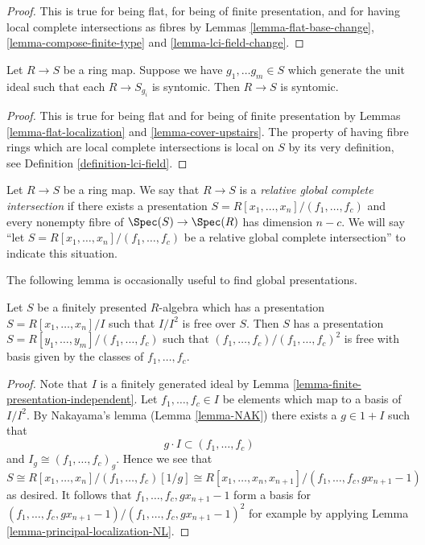 \begin{proof}
This is true for being flat, for being of finite presentation,
and for having local complete intersections as fibres by
Lemmas \ref{lemma-flat-base-change}, \ref{lemma-compose-finite-type} and
\ref{lemma-lci-field-change}.
\end{proof}

\begin{lemma}
\label{lemma-local-syntomic}
Let $R \to S$ be a ring map.
Suppose we have $g_1, \ldots g_m \in S$ which generate the
unit ideal such that each $R \to S_{g_i}$ is syntomic.
Then $R \to S$ is syntomic.
\end{lemma}

\begin{proof}
This is true for being flat and for being of finite presentation by
Lemmas \ref{lemma-flat-localization} and \ref{lemma-cover-upstairs}.
The property of having fibre rings which are local complete intersections
is local on $S$ by its very definition, see
Definition \ref{definition-lci-field}.
\end{proof}

\begin{definition}
\label{definition-relative-global-complete-intersection}
Let $R \to S$ be a ring map. We say that $R \to S$ is
a {\it relative global complete intersection} if there exists
a presentation $S = R[x_1, \ldots, x_n]/(f_1, \ldots, f_c)$ and
every nonempty fibre of $\Spec(S) \to \Spec(R)$ has dimension $n - c$.
We will say ``let $S = R[x_1, \ldots, x_n]/(f_1, \ldots, f_c)$ be a relative
global complete intersection'' to indicate this situation.
\end{definition}

\noindent
The following lemma is occasionally useful to find
global presentations.

\begin{lemma}
\label{lemma-huber}
Let $S$ be a finitely presented $R$-algebra which has a presentation
$S = R[x_1, \ldots, x_n]/I$ such that $I/I^2$ is free over $S$. Then
$S$ has a presentation $S = R[y_1, \ldots, y_m]/(f_1, \ldots, f_c)$
such that $(f_1, \ldots, f_c)/(f_1, \ldots, f_c)^2$ is free with
basis given by the classes of $f_1, \ldots, f_c$.
\end{lemma}

\begin{proof}
Note that $I$ is a finitely generated ideal by
Lemma \ref{lemma-finite-presentation-independent}.
Let $f_1, \ldots, f_c \in I$ be elements which map to a basis of $I/I^2$.
By Nakayama's lemma (Lemma \ref{lemma-NAK})
there exists a $g \in 1 + I$ such that
$$
g \cdot I \subset (f_1, \ldots, f_c)
$$
and $I_g \cong (f_1, \ldots, f_c)_g$. Hence we see that
$$
S \cong R[x_1, \ldots, x_n]/(f_1, \ldots, f_c)[1/g]
\cong R[x_1, \ldots, x_n, x_{n + 1}]/(f_1, \ldots, f_c, gx_{n + 1} - 1)
$$
as desired. It follows that $f_1, \ldots, f_c,gx_{n + 1} - 1$
form a basis for
$(f_1, \ldots, f_c, gx_{n + 1} - 1)/(f_1, \ldots, f_c, gx_{n + 1} - 1)^2$
for example by applying Lemma \ref{lemma-principal-localization-NL}.
\end{proof}



